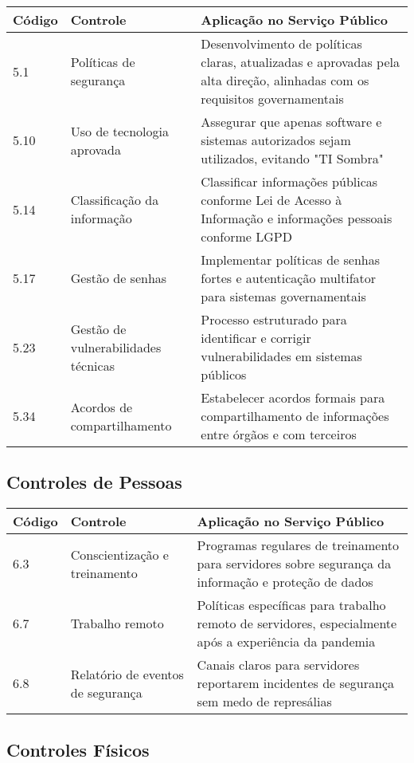 \documentclass[12pt,a4paper]{report}
\begin{document}
\begin{longtable}{p{2cm}p{4cm}p{9cm}}
\toprule
\textbf{Código} & \textbf{Controle} & \textbf{Aplicação no Serviço Público} \\
\midrule
5.1 & Políticas de segurança & Desenvolvimento de políticas claras, atualizadas e aprovadas pela alta direção, alinhadas com os requisitos governamentais \\
\midrule
5.10 & Uso de tecnologia aprovada & Assegurar que apenas software e sistemas autorizados sejam utilizados, evitando "TI Sombra" \\
\midrule
5.14 & Classificação da informação & Classificar informações públicas conforme Lei de Acesso à Informação e informações pessoais conforme LGPD \\
\midrule
5.17 & Gestão de senhas & Implementar políticas de senhas fortes e autenticação multifator para sistemas governamentais \\
\midrule
5.23 & Gestão de vulnerabilidades técnicas & Processo estruturado para identificar e corrigir vulnerabilidades em sistemas públicos \\
\midrule
5.34 & Acordos de compartilhamento & Estabelecer acordos formais para compartilhamento de informações entre órgãos e com terceiros \\
\bottomrule
\end{longtable}

\subsection{Controles de Pessoas}

\begin{longtable}{p{2cm}p{4cm}p{9cm}}
\toprule
\textbf{Código} & \textbf{Controle} & \textbf{Aplicação no Serviço Público} \\
\midrule
6.3 & Conscientização e treinamento & Programas regulares de treinamento para servidores sobre segurança da informação e proteção de dados \\
\midrule
6.7 & Trabalho remoto & Políticas específicas para trabalho remoto de servidores, especialmente após a experiência da pandemia \\
\midrule
6.8 & Relatório de eventos de segurança & Canais claros para servidores reportarem incidentes de segurança sem medo de represálias \\
\bottomrule
\end{longtable}

\subsection{Controles Físicos}
\end{document}
